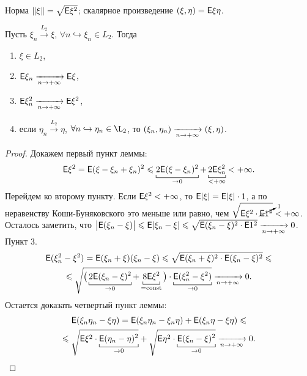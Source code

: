 Норма $ \| \xi \| = \sqrt{\mathsf{E} \xi^2}$;  скалярное произведение $(\xi, \eta) = \mathsf{E} \xi\eta$.
\begin{lemma}
	Пусть $\xi_n \xrightarrow{L_2} \xi$, $\forall n \hookrightarrow \xi_n \in L_2$. Тогда
	\begin{enumerate}
		\item $\xi \in L_2$,
		\item $\mathsf{E}\xi_n \xrightarrow[n \rightarrow + \infty]{} \mathsf{E} \xi$,
		\item $\mathsf{E} \xi_n^2 \xrightarrow[n \rightarrow + \infty]{} \mathsf{E}\xi^2$,
		\item {если $\eta_n \xrightarrow{L_2} \eta$, $\forall n \hookrightarrow \eta_n \in \L_2$, то $(\xi_n, \eta_n) \xrightarrow[n \rightarrow + \infty]{} (\xi, \eta)$.}
	\end{enumerate}
	\begin{proof}
		Докажем первый пункт леммы:
		$$\E \xi^2 = \E ( \xi - \xi_n + \xi_n)^2 \leqslant \underbracket[0.5pt]{2\E( \xi - \xi_n)^2}_{\rightarrow 0} + \underbracket[0.5pt]{2\E \xi_n^2}_{< + \infty} < +\infty.$$
		Перейдем ко второму пункту. Если $\mathsf{E} \xi^2 < + \infty$, то $\mathsf{E} | \xi | = \mathsf{E} | \xi| \cdot 1$, а по неравенству Коши-Буняковского это меньше или равно, чем $\sqrt{\mathsf{E} \xi^2 \cdot \cancelto{1}{\mathsf{E} 1^2}} < + \infty$. Осталось заметить, что $\big| \mathsf{E} ( \xi_n - \xi ) \big| \leqslant \mathsf{E} | \xi_n - \xi | \leqslant \sqrt{\mathsf{E} (\xi_n - \xi)^2 \cdot \mathsf{E} 1^2} \xrightarrow[n \rightarrow + \infty]{} 0$.
		Пункт 3. 
		\begin{multline*}
			\E ( \xi_n^2 - \xi^2) = 
			\E ( \xi_n + \xi)(\xi_n - \xi) \leqslant \sqrt{ \E (\xi_n + \xi)^2 \cdot \E (\xi_n - \xi)^2} \leqslant \\ \leqslant
			 \sqrt{\big( \underbracket[0.5pt]{2 \E( \xi_n - \xi)^2}_{\rightarrow 0} + \underbracket[0.5pt]{8\E \xi^2}_{=\const} \big) \cdot \underbracket[0.5pt]{\E (\xi_n^2 - \xi^2)}_{\rightarrow 0}} \limn 0.
		\end{multline*}
		Остается доказать четвертый пункт леммы:
		\begin{multline*}
			\E ( \xi_n \eta_n - \xi \eta) = 
			\E( \xi_n \eta_n - \xi_n \eta) + \E( \xi_n \eta - \xi \eta) \leqslant  \\ \leqslant
			\sqrt{\E\xi^2 \cdot \underbracket[0.5pt]{\E (\eta_n - \eta)^2}_{\rightarrow 0}} + \sqrt{\E \eta^2 \cdot \underbracket[0.5pt]{\E(\xi_n - \xi)^2}_{\rightarrow 0}} \limn 0.
		\end{multline*}
	\end{proof}
\end{lemma}